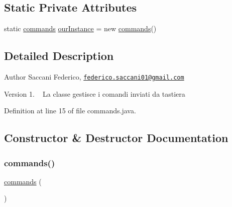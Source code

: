 \subsection*{Static Private Attributes}
\begin{DoxyCompactItemize}
\item 
static \mbox{\hyperlink{class_snake_1_1game_1_1utility_1_1commands}{commands}} \mbox{\hyperlink{class_snake_1_1game_1_1utility_1_1commands_aa7a70ebde8ae359567827667a6ce1901}{our\+Instance}} = new \mbox{\hyperlink{class_snake_1_1game_1_1utility_1_1commands}{commands}}()
\end{DoxyCompactItemize}


\subsection{Detailed Description}
\begin{DoxyAuthor}{Author}
Saccani Federico, \href{mailto:federico.saccani01@gmail.com}{\tt federico.\+saccani01@gmail.\+com} 
\end{DoxyAuthor}
\begin{DoxyVersion}{Version}
1. ~\newline
La classe gestisce i comandi inviati da tastiera 
\end{DoxyVersion}


Definition at line 15 of file commands.\+java.



\subsection{Constructor \& Destructor Documentation}
\mbox{\label{class_snake_1_1game_1_1utility_1_1commands_af0afefa0d79d09344a638cf6c532aa39}} 
\subsubsection{\texorpdfstring{commands()}{commands()}}
{\footnotesize\ttfamily \mbox{\hyperlink{class_snake_1_1game_1_1utility_1_1commands}{commands}} (\begin{DoxyParamCaption}{ }\end{DoxyParamCaption})\hspace{0.3cm}{\ttfamily [private]}}




